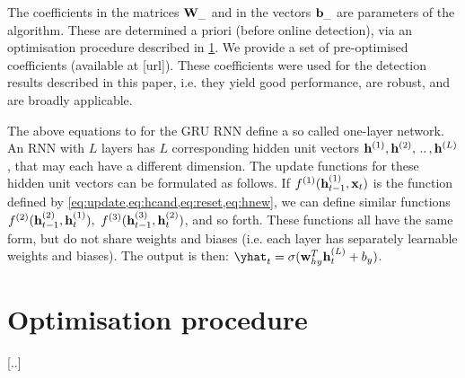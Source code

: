 \documentclass[Master_Thesis.tex]{subfiles}
\begin{document}
The coefficients in the matrices $\vb{W}_\_$ and in the vectors $\vb{b}_\_$ are parameters of the algorithm.\footnotemark{} These are determined a priori (before online \swr{} detection), via an optimisation procedure described in \cref{sec:optimisation}. We provide a set of pre-optimised coefficients (available at [url]). These coefficients were used for the \swr{} detection results described in this paper, i.e. they yield good performance, are robust, and are broadly applicable. %

The above equations  to  for the GRU RNN define a so called one-layer network.\footnotemark{} An RNN with $L$ layers has $L$ corresponding hidden unit vectors $\vb{h}^{(1)}, \vb{h}^{(2)}, \,..\,, \vb{h}^{(L)}$, that may each have a different dimension. The update functions for these hidden unit vectors can be formulated as follows. If $f^{(1)}(\vb{h}^{(1)}_{t-1}, \vb{x}_t)$ is the function defined by \cref{eq:update,eq:hcand,eq:reset,eq:hnew}, we can define similar functions $f^{(2)}(\vb{h}^{(2)}_{t-1}, \vb{h}^{(1)}_t), \  f^{(3)}(\vb{h}^{(3)}_{t-1}, \vb{h}^{(2)}_t)$, and so forth. These functions all have the same form, but do not share weights and biases (i.e. each layer has separately learnable weights and biases). The output is then: $\yhat_t = \sigma( \vb{w}_{hy}\trans \h^{(L)}_t + b_y )$.




\section{Optimisation procedure}
\label{sec:optimisation}

[..]



\end{document}
